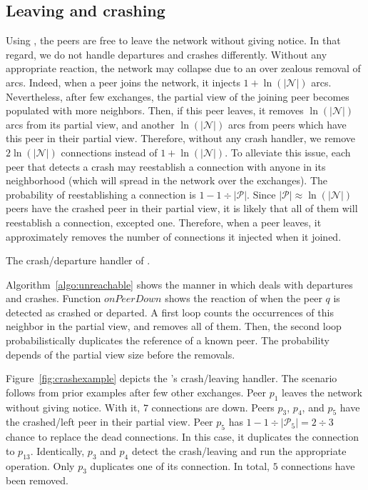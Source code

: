 \subsection{Leaving and crashing}
\label{subsec:leaving}

Using \SPRAY, the peers are free to leave the network without giving notice. In
that regard, we do not handle departures and crashes differently.
Without any appropriate reaction, the network may collapse due to an over
zealous removal of arcs. Indeed, when a peer joins the network, it injects
$1+\ln(|\mathcal{N}|)$ arcs. Nevertheless, after few exchanges, the partial
view of the joining peer becomes populated with more neighbors. Then, if this
peer leaves, it removes $\ln(|\mathcal{N}|)$ arcs from its partial view, and
another $\ln(|\mathcal{N}|)$ arcs from peers which have this peer in their
partial view. Therefore, without any crash handler, we remove
$2\ln(|\mathcal{N}|)$ connections instead of $1+\ln(|\mathcal{N}|)$. To
alleviate this issue, each peer that detects a crash may reestablish a
connection with anyone in its neighborhood (which will spread in the network
over the exchanges). The probability of reestablishing a connection is
$1-{1\div{|\mathcal{P}|}}$. Since ${|\mathcal{P}|}\approx \ln(|\mathcal{N}|)$
peers have the crashed peer in their partial view, it is likely that all of
them will reestablish a connection, excepted one. Therefore, when a peer
leaves, it approximately removes the number of connections it injected when it
joined.

\begin{algorithm}[h]
  
  \caption{\label{algo:unreachable}The crash/departure handler of \SPRAY.}
\end{algorithm}

Algorithm~\ref{algo:unreachable} shows the manner in which \SPRAY deals with
departures and crashes.  Function $onPeerDown$ shows the reaction of \SPRAY
when the peer $q$ is detected as crashed or departed. A first loop counts the
occurrences of this neighbor in the partial view, and removes all of
them. Then, the second loop probabilistically duplicates the reference of a
known peer. The probability depends of the partial view size before the
removals.

Figure~\ref{fig:crashexample} depicts the \SPRAY's crash/leaving handler. The
scenario follows from prior examples after few other exchanges. Peer $p_1$
leaves the network without giving notice. With it, $7$ connections are
down. Peers $p_3$, $p_4$, and $p_5$ have the crashed/left peer in their partial
view. Peer $p_5$ has $1-{1\div{|\mathcal{P}_5|}}={2\div{3}}$ chance to replace
the dead connections. In this case, it duplicates the connection to
$p_{13}$. Identically, $p_3$ and $p_4$ detect the crash/leaving and run the
appropriate operation. Only $p_3$ duplicates one of its connection. In total,
$5$ connections have been removed.

